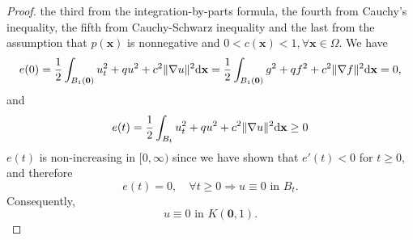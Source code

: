 \begin{proof}
  the third from the integration-by-parts formula,
  the fourth from Cauchy's inequality, the fifth from
  Cauchy-Schwarz inequality and the last from the assumption that
  $p(\mathbf{x})$ is nonnegative and $0<c(\mathbf{x})<1, \forall \mathbf{x}\in\Omega$.
  We have
  \begin{displaymath}
    e(0) = \frac{1}{2}\int_{B_1(\mathbf{0})}u_t^2+qu^2+c^2\|\nabla u\|^2\mathrm{d} \mathbf{x} = \frac{1}{2}\int_{B_1(\mathbf{0})}g^2+qf^2+c^2\|\nabla f\|^2\mathrm{d} \mathbf{x} = 0,
  \end{displaymath}
  and
  \begin{displaymath}
    e(t) = \frac{1}{2}\int_{B_t}u_t^2+qu^2+c^2\|\nabla u\|^2\mathrm{d} \mathbf{x} \ge 0
  \end{displaymath}
  $e(t)$ is non-increasing in $[0, \infty)$
  since we have shown that $e'(t)<0$ for $t\ge 0$,
  and therefore
  \begin{displaymath}
    e(t) = 0, \quad \forall t\ge 0 \Rightarrow
    u \equiv 0 \text{ in } B_t.
  \end{displaymath}
  Consequently,
  \begin{displaymath}
    u \equiv 0 \text{ in } K(\mathbf{0}, 1).
  \end{displaymath}
\end{proof}

